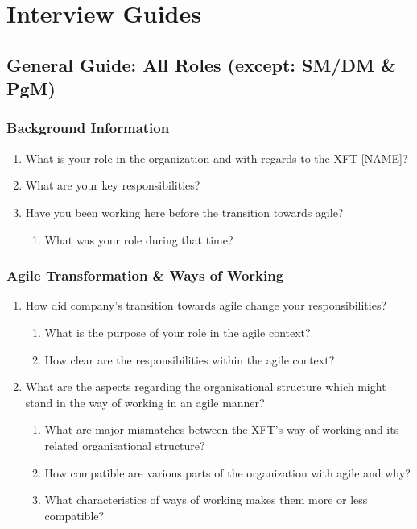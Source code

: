 \chapter{Interview Guides}
\label{app:interview-guides}

\section*{General Guide: All Roles (except: SM/DM \& PgM)}

\subsection*{Background Information}

\begin{enumerate}
  \item What is your role in the organization and with regards to the XFT [NAME]?
  \item What are your key responsibilities?
  \item Have you been working here before the transition towards agile?
  \begin{enumerate}
    \item What was your role during that time?
  \end{enumerate}
\end{enumerate}

\subsection*{Agile Transformation \& Ways of Working}

\begin{enumerate}
  \item How did company’s transition towards agile change your responsibilities?
  
  \begin{enumerate}
     \item What is the purpose of your role in the agile context?
     \item How clear are the responsibilities within the agile context?
  \end{enumerate}
  
  \item What are the aspects regarding the organisational structure which might stand in the way of working in an agile manner?
  
  \begin{enumerate}
    \item What are major mismatches between the XFT’s way of working and its related organisational structure?
    \item How compatible are various parts of the organization with agile and why?
    \item What characteristics of ways of working makes them more or less compatible?
  \end{enumerate}
\end{enumerate}

